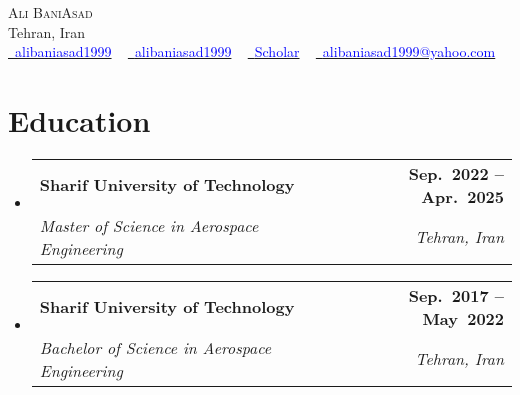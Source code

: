 \documentclass[letterpaper,11pt]{article}
\makeatletter
\newcommand{\resumeSubheading}[4]{
  \vspace{-2pt}\item
    \begin{tabular*}{1.0\textwidth}[t]{l@{\extracolsep{\fill}}r}
      \textbf{ #1} & \textbf{\small #2} \\
      \textsl{\small #3} & \textit{\small #4} \\
    \end{tabular*}\vspace{-7pt}
}
\newcommand{\resumeSubHeadingListStart}{\begin{itemize}[leftmargin=0.0in, label={}]}
\newcommand{\resumeSubHeadingListEnd}{\end{itemize}}
\makeatother
\begin{document}
\begin{center}
    {\Huge \scshape Ali BaniAsad} \\ \vspace{1pt}
    Tehran, Iran \\ \vspace{1pt}
    \small 
    \href{https://linkedin.com/in/alibaniasad1999/}{\raisebox{-0.2\height}\faLinkedin\ \textcolor{blue}{alibaniasad1999}}  ~
    \href{https://github.com/alibaniasad1999}{\raisebox{-0.2\height}\faGithub\ \textcolor{blue}{alibaniasad1999}} ~ 
    \href{https://scholar.google.com/citations?user=KeKpSvEAAAAJ}{\raisebox{-0.2\height}\faGraduationCap\ \textcolor{blue}{Scholar}} ~
    \href{mailto:alibaniasad1999@yahoo.com}{\raisebox{-0.2\height}\faEnvelope\  \textcolor{blue}{{alibaniasad1999@yahoo.com}}} 
    \vspace{-8pt}
\end{center}

\vspace{-18pt}
\section{Education}
  \resumeSubHeadingListStart

  \resumeSubheading
  {Sharif University of Technology}{Sep.\ 2022 -- Apr.\ 2025
  }
  {Master of Science in Aerospace Engineering
  }{Tehran, Iran}
  \vspace{-3pt}

    \resumeSubheading
      {Sharif University of Technology}{Sep.\ 2017 -- May\ 2022
      }
      {Bachelor of Science in Aerospace Engineering
      }{Tehran, Iran}



  \resumeSubHeadingListEnd
\end{document}
